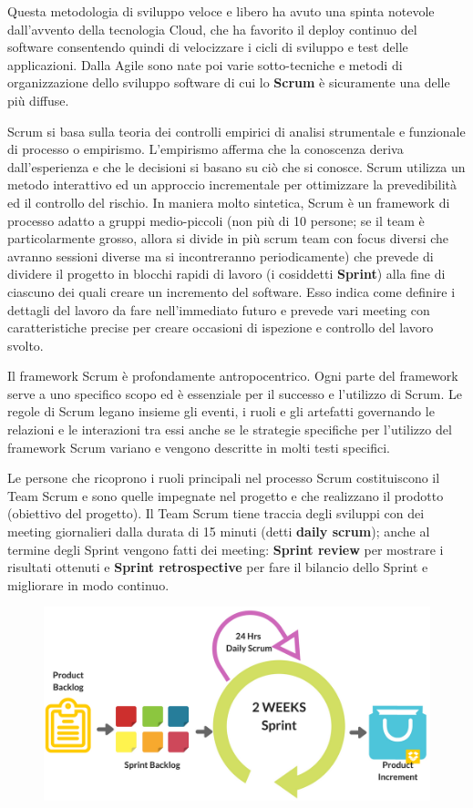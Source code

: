Questa metodologia di sviluppo veloce e libero ha avuto una spinta notevole dall’avvento della tecnologia Cloud, che ha favorito il deploy continuo
del software consentendo quindi di velocizzare i cicli di sviluppo e test delle applicazioni.
Dalla Agile sono nate poi varie sotto-tecniche e metodi di organizzazione dello sviluppo software di cui lo \textbf{Scrum} è sicuramente una delle
più diffuse. 

Scrum si basa sulla teoria dei controlli empirici di analisi strumentale e funzionale di processo o empirismo. L'empirismo afferma che la conoscenza
deriva dall'esperienza e che le decisioni si basano su ciò che si conosce. Scrum utilizza un metodo interattivo ed un approccio incrementale per
ottimizzare la prevedibilità ed il controllo del rischio.
In maniera molto sintetica, Scrum è un framework di processo adatto a gruppi medio-piccoli (non più di 10 persone; se il team è particolarmente grosso,
allora si divide in più scrum team con focus diversi che avranno sessioni diverse ma si incontreranno periodicamente) che prevede di dividere il
progetto in blocchi rapidi di lavoro (i cosiddetti \textbf{Sprint}) alla fine di ciascuno dei quali creare un incremento del software. Esso indica
come definire i dettagli del lavoro da fare nell'immediato futuro e prevede vari meeting con caratteristiche precise per creare occasioni di
ispezione e controllo del lavoro svolto.

Il framework Scrum è profondamente antropocentrico. Ogni parte del framework serve a uno specifico scopo ed è essenziale per il successo e l'utilizzo
di Scrum. Le regole di Scrum legano insieme gli eventi, i ruoli e gli artefatti governando le relazioni e le interazioni tra essi anche se le
strategie specifiche per l'utilizzo del framework Scrum variano e vengono descritte in molti testi specifici.

Le persone che ricoprono i ruoli principali nel processo Scrum costituiscono il Team Scrum e sono quelle impegnate nel progetto e che realizzano il
prodotto (obiettivo del progetto). Il Team Scrum tiene traccia degli sviluppi con dei meeting giornalieri dalla durata di 15 minuti (detti
\textbf{daily scrum}); anche al termine degli Sprint vengono fatti dei meeting: \textbf{Sprint review} per mostrare i risultati ottenuti e
\textbf{Sprint retrospective} per fare il bilancio dello Sprint e migliorare in modo continuo.

\begin{figure}[h!]
	\centering
	\includegraphics[scale=0.5]{"immagini/Scrum-Agile-Marketing"}
\end{figure}

